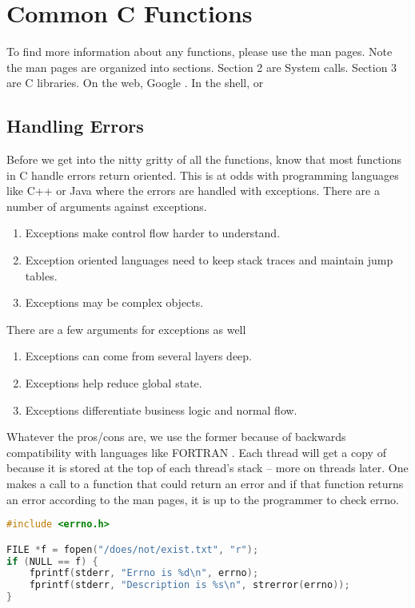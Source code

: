 \section{Common C Functions}

To find more information about any functions, please use the man pages.
Note the man pages are organized into sections.
Section 2 are System calls.
Section 3 are C libraries.
On the web, Google .
In the shell,  or 

\subsection{Handling Errors}

Before we get into the nitty gritty of all the functions, know that most functions in C handle errors return oriented.
This is at odds with programming languages like C++ or Java where the errors are handled with exceptions.
There are a number of arguments against exceptions.

\begin{enumerate}
\item Exceptions make control flow harder to understand.
\item Exception oriented languages need to keep stack traces and maintain jump tables.
\item Exceptions may be complex objects.
\end{enumerate}

There are a few arguments for exceptions as well

\begin{enumerate}
\item Exceptions can come from several layers deep.
\item Exceptions help reduce global state.
\item Exceptions differentiate business logic and normal flow.
\end{enumerate}

Whatever the pros/cons are, we use the former because of backwards compatibility with languages like FORTRAN \cite[P. 84]{fortran72}.
Each thread will get a copy of  because it is stored at the top of each thread's stack -- more on threads later.
One makes a call to a function that could return an error and if that function returns an error according to the man pages, it is up to the programmer to check errno.

\begin{lstlisting}[language=C]
#include <errno.h>

FILE *f = fopen("/does/not/exist.txt", "r");
if (NULL == f) {
    fprintf(stderr, "Errno is %d\n", errno);
    fprintf(stderr, "Description is %s\n", strerror(errno));
}
\end{lstlisting}


